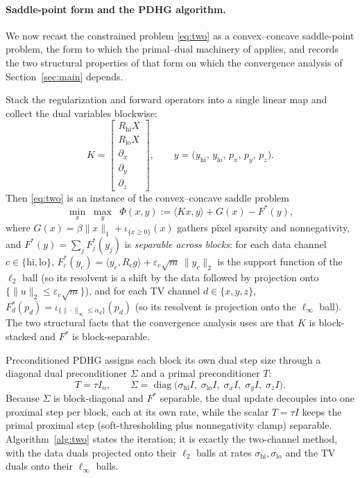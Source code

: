 \documentclass{article}
\newcommand{\diag}{\operatorname{diag}}
\begin{document}
\paragraph{Saddle-point form and the PDHG algorithm.}
We now recast the constrained problem \eqref{eq:two} as a convex--concave saddle-point problem, the form to which the primal--dual machinery of \citet{chambolle2011first} applies, and records the two structural properties of that form on which the convergence analysis of Section~\ref{sec:main} depends.

Stack the regularization and forward operators into a single linear map and collect the dual variables blockwise:
\begin{equation}
\label{eq:K}
K=\begin{bmatrix} R_{\mathrm{hi}}X\\ R_{\mathrm{lo}}X\\ \partial_x\\ \partial_y\\ \partial_z\end{bmatrix},
\qquad
y=\big(y_{\mathrm{hi}},\,y_{\mathrm{lo}},\,p_x,\,p_y,\,p_z\big).
\end{equation}
Then \eqref{eq:two} is an instance of the convex--concave saddle problem
\begin{equation}
\label{eq:saddle}
\min_{x}\;\max_{y}\;\; \Phi(x,y):=\langle Kx,y\rangle+G(x)-F^\ast(y),
\end{equation}
where $G(x)=\beta\|x\|_1+\iota_{\{x\ge0\}}(x)$ gathers pixel sparsity and nonnegativity, and $F^\ast(y)=\sum_j F_j^\ast(y_j)$ is \emph{separable across blocks}: for each data channel $c\in\{\mathrm{hi},\mathrm{lo}\}$, $F_c^\ast(y_c)=\langle y_c,R_c g\rangle+\varepsilon_c\sqrt{m}\,\|y_c\|_2$ is the support function of the $\ell_2$ ball (so its resolvent is a shift by the data followed by projection onto $\{\|u\|_2\le\varepsilon_c\sqrt m\}$), and for each TV channel $d\in\{x,y,z\}$, $F_d^\ast(p_d)=\iota_{\{\|\cdot\|_\infty\le\alpha_d\}}(p_d)$ (so its resolvent is projection onto the $\ell_\infty$ ball). The two structural facts that the convergence analysis uses are that $K$ is block-stacked and $F^\ast$ is block-separable.

Preconditioned PDHG assigns each block its own dual step size through a diagonal dual preconditioner $\Sigma$ and a primal preconditioner $T$:
\begin{equation}
\label{eq:precond-def}
T=\tau I_n,\qquad
\Sigma=\diag\!\big(\sigma_{\mathrm{hi}}I,\;\sigma_{\mathrm{lo}}I,\;\sigma_x I,\;\sigma_y I,\;\sigma_z I\big).
\end{equation}
Because $\Sigma$ is block-diagonal and $F^\ast$ separable, the dual update decouples into one proximal step per block, each at its own rate, while the scalar $T=\tau I$ keeps the primal proximal step (soft-thresholding plus nonnegativity clamp) separable. Algorithm~\ref{alg:two} states the iteration; it is exactly the two-channel method, with the data duals projected onto their $\ell_2$ balls at rates $\sigma_{\mathrm{hi}},\sigma_{\mathrm{lo}}$ and the TV duals onto their $\ell_\infty$ balls.
\end{document}
